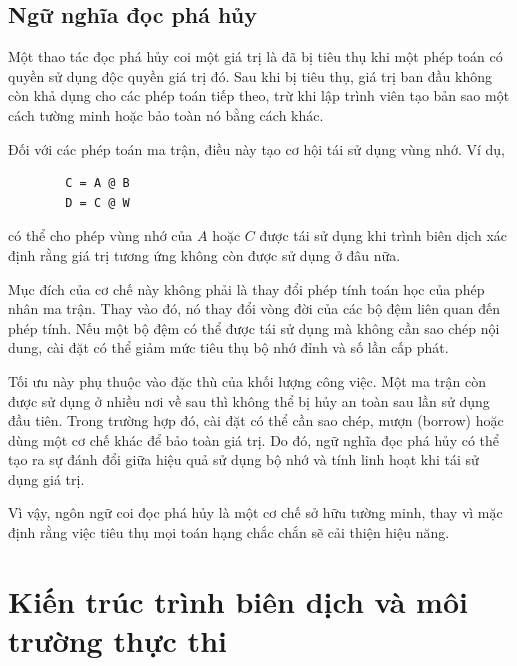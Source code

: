 \documentclass[a4paper]{article}
\begin{document}
	\subsection{Ngữ nghĩa đọc phá hủy}
	
	Một thao tác đọc phá hủy coi một giá trị là đã bị tiêu thụ khi một phép toán có quyền sử dụng độc quyền giá trị đó. Sau khi bị tiêu thụ, giá trị ban đầu không còn khả dụng cho các phép toán tiếp theo, trừ khi lập trình viên tạo bản sao một cách tường minh hoặc bảo toàn nó bằng cách khác.
	
	Đối với các phép toán ma trận, điều này tạo cơ hội tái sử dụng vùng nhớ. Ví dụ,
	
	\begin{lstlisting}
		C = A @ B
		D = C @ W
	\end{lstlisting}
	
	có thể cho phép vùng nhớ của $A$ hoặc $C$ được tái sử dụng khi trình biên dịch xác định rằng giá trị tương ứng không còn được sử dụng ở đâu nữa.
	
	Mục đích của cơ chế này không phải là thay đổi phép tính toán học của phép nhân ma trận. Thay vào đó, nó thay đổi vòng đời của các bộ đệm liên quan đến phép tính. Nếu một bộ đệm có thể được tái sử dụng mà không cần sao chép nội dung, cài đặt có thể giảm mức tiêu thụ bộ nhớ đỉnh và số lần cấp phát.
	
	Tối ưu này phụ thuộc vào đặc thù của khối lượng công việc. Một ma trận còn được sử dụng ở nhiều nơi về sau thì không thể bị hủy an toàn sau lần sử dụng đầu tiên. Trong trường hợp đó, cài đặt có thể cần sao chép, mượn (borrow) hoặc dùng một cơ chế khác để bảo toàn giá trị. Do đó, ngữ nghĩa đọc phá hủy có thể tạo ra sự đánh đổi giữa hiệu quả sử dụng bộ nhớ và tính linh hoạt khi tái sử dụng giá trị.
	
	Vì vậy, ngôn ngữ coi đọc phá hủy là một cơ chế sở hữu tường minh, thay vì mặc định rằng việc tiêu thụ mọi toán hạng chắc chắn sẽ cải thiện hiệu năng.
	
	\section{Kiến trúc trình biên dịch và môi trường thực thi}
	
	
\end{document}
